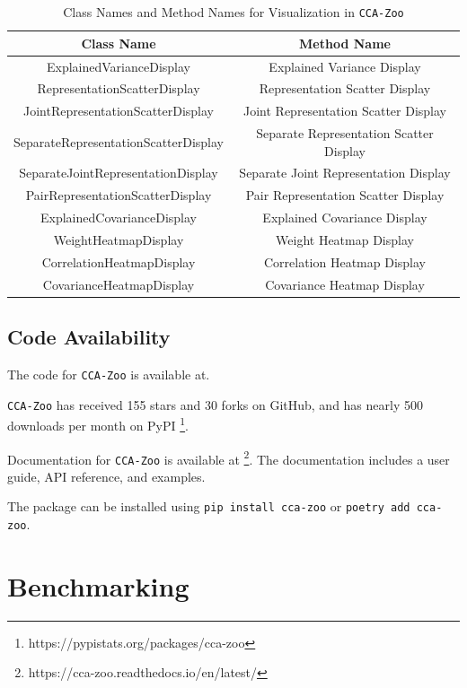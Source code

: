 \begin{table}[ht]
    \centering
    \begin{tabular}{|c|c|}
        \hline
        Class Name & Method Name \\
        \hline
        ExplainedVarianceDisplay & Explained Variance Display \\
        RepresentationScatterDisplay & Representation Scatter Display \\
        JointRepresentationScatterDisplay & Joint Representation Scatter Display \\
        SeparateRepresentationScatterDisplay & Separate Representation Scatter Display \\
        SeparateJointRepresentationDisplay & Separate Joint Representation Display \\
        PairRepresentationScatterDisplay & Pair Representation Scatter Display \\
        ExplainedCovarianceDisplay & Explained Covariance Display \\
        WeightHeatmapDisplay & Weight Heatmap Display \\
        CorrelationHeatmapDisplay & Correlation Heatmap Display \\
        CovarianceHeatmapDisplay & Covariance Heatmap Display \\
        \hline
    \end{tabular}
    \caption{Class Names and Method Names for Visualization in \texttt{CCA-Zoo}}\label{tab:vis_method}
\end{table}

\subsection{Code Availability}

The code for \texttt{CCA-Zoo} is available at.

\texttt{CCA-Zoo} has received 155 stars and 30 forks on GitHub, and has nearly 500 downloads per month on PyPI \footnote{https://pypistats.org/packages/cca-zoo}.

Documentation for \texttt{CCA-Zoo} is available at \footnote{https://cca-zoo.readthedocs.io/en/latest/}.
The documentation includes a user guide, API reference, and examples.

The package can be installed using \texttt{pip install cca-zoo} or \texttt{poetry add cca-zoo}.



\section{Benchmarking}

